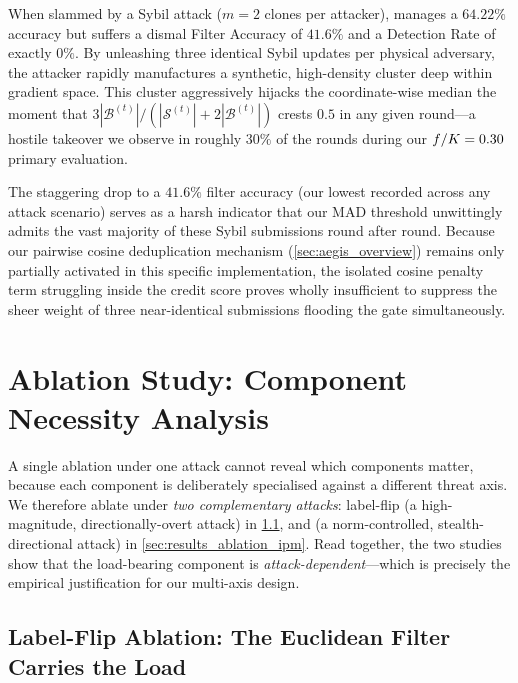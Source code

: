\documentclass[../main.tex]{subfiles}
\begin{document}
When slammed by a Sybil attack ($m=2$ clones per attacker), \aegis{} manages a $64.22\%$ accuracy but suffers a dismal Filter Accuracy of $41.6\%$ and a Detection Rate of exactly $0\%$. By unleashing three identical Sybil updates per physical adversary, the attacker rapidly manufactures a synthetic, high-density cluster deep within gradient space. This cluster aggressively hijacks the coordinate-wise median the moment that $3|\mathcal{B}^{(t)}|/(|\mathcal{S}^{(t)}| + 2|\mathcal{B}^{(t)}|)$ crests $0.5$ in any given round---a hostile takeover we observe in roughly $30\%$ of the rounds during our $f/K=0.30$ primary evaluation.

The staggering drop to a $41.6\%$ filter accuracy (our lowest recorded across any attack scenario) serves as a harsh indicator that our MAD threshold unwittingly admits the vast majority of these Sybil submissions round after round. Because our pairwise cosine deduplication mechanism (\cref{sec:aegis_overview}) remains only partially activated in this specific implementation, the isolated cosine penalty term struggling inside the credit score proves wholly insufficient to suppress the sheer weight of three near-identical submissions flooding the gate simultaneously.

\section{Ablation Study: Component Necessity Analysis}
\label{sec:results_ablation}

A single ablation under one attack cannot reveal which components matter, because each \aegis{} component is deliberately specialised against a different threat axis. We therefore ablate under \emph{two complementary attacks}: label-flip (a high-magnitude, directionally-overt attack) in \cref{sec:results_ablation_lf}, and \ipm{} (a norm-controlled, stealth-directional attack) in \cref{sec:results_ablation_ipm}. Read together, the two studies show that the load-bearing component is \emph{attack-dependent}---which is precisely the empirical justification for our multi-axis design.

\subsection{Label-Flip Ablation: The Euclidean Filter Carries the Load}
\label{sec:results_ablation_lf}
\end{document}
